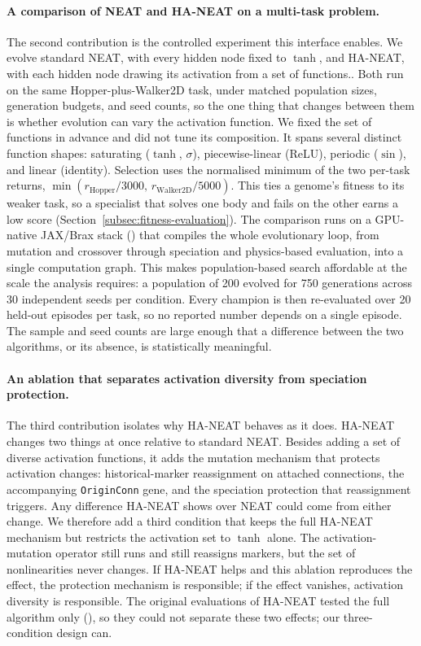 \documentclass[12pt]{article}
\begin{document}
\paragraph{A comparison of NEAT and HA-NEAT on a multi-task problem.}
The second contribution is the controlled experiment this interface enables.
We evolve standard NEAT, with every hidden node fixed to $\tanh$, and HA-NEAT, with each hidden node drawing its activation from a set of functions..
Both run on the same Hopper-plus-Walker2D task, under matched population sizes, generation budgets, and seed counts, so the one thing that changes between them is whether evolution can vary the activation function.
We fixed the set of functions in advance and did not tune its composition.
It spans several distinct function shapes: saturating ($\tanh$, $\sigma$), piecewise-linear (ReLU), periodic ($\sin$), and linear (identity).
Selection uses the normalised minimum of the two per-task returns, $\min(r_{\text{Hopper}}/3000,\, r_{\text{Walker2D}}/5000)$.
This ties a genome's fitness to its weaker task, so a specialist that solves one body and fails on the other earns a low score (Section~\ref{subsec:fitness-evaluation}).
The comparison runs on a GPU-native JAX/Brax stack (\cite{freeman_brax_2021,wang_tensorized_2024}) that compiles the whole evolutionary loop, from mutation and crossover through speciation and physics-based evaluation, into a single computation graph.
This makes population-based search affordable at the scale the analysis requires: a population of 200 evolved for 750 generations across 30 independent seeds per condition.
Every champion is then re-evaluated over 20 held-out episodes per task, so no reported number depends on a single episode.
The sample and seed counts are large enough that a difference between the two algorithms, or its absence, is statistically meaningful.

\paragraph{An ablation that separates activation diversity from speciation protection.}
The third contribution isolates why HA-NEAT behaves as it does.
HA-NEAT changes two things at once relative to standard NEAT.
Besides adding a set of diverse activation functions, it adds the mutation mechanism that protects activation changes: historical-marker reassignment on attached connections, the accompanying \texttt{OriginConn} gene, and the speciation protection that reassignment triggers.
Any difference HA-NEAT shows over NEAT could come from either change.
We therefore add a third condition that keeps the full HA-NEAT mechanism but restricts the activation set to $\tanh$ alone.
The activation-mutation operator still runs and still reassigns markers, but the set of nonlinearities never changes.
If HA-NEAT helps and this ablation reproduces the effect, the protection mechanism is responsible; if the effect vanishes, activation diversity is responsible.
The original evaluations of HA-NEAT tested the full algorithm only (\cite{hagg_evolving_2017}), so they could not separate these two effects; our three-condition design can.
\end{document}
